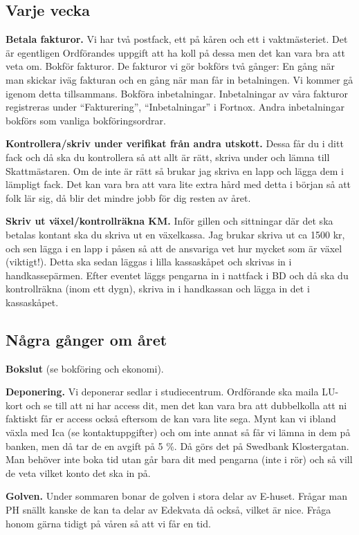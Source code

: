 \documentclass[10pt]{article}
\begin{document}
\subsection{Varje vecka}
\textbf{Betala fakturor.} Vi har två postfack, ett på kåren och ett i vaktmästeriet. Det är egentligen Ordförandes uppgift att ha koll på dessa men det kan vara bra att veta om.
Bokför fakturor. De fakturor vi gör bokförs två gånger: En gång när man skickar iväg fakturan och en gång när man får in betalningen. Vi kommer gå igenom detta tillsammans.
Bokföra inbetalningar. Inbetalningar av våra fakturor registreras under “Fakturering”, “Inbetalningar” i Fortnox. Andra inbetalningar bokförs som vanliga bokföringsordrar.

\textbf{Kontrollera/skriv under verifikat från andra utskott.} Dessa får du i ditt fack och då ska du kontrollera så att allt är rätt, skriva under och lämna till Skattmästaren. Om de inte är rätt så brukar jag skriva en lapp och lägga dem i lämpligt fack. Det kan vara bra att vara lite extra hård med detta i början så att folk lär sig, då blir det mindre jobb för dig resten av året.

\textbf{Skriv ut växel/kontrollräkna KM.} Inför gillen och sittningar där det ska betalas kontant ska du skriva ut en växelkassa. Jag brukar skriva ut ca 1500 kr, och sen lägga i en lapp i påsen så att de ansvariga vet hur mycket som är växel (viktigt!). Detta ska sedan läggas i lilla kassaskåpet och skrivas in i handkassepärmen. Efter eventet läggs pengarna in i nattfack i BD och då ska du kontrollräkna (inom ett dygn), skriva in i handkassan och lägga in det i kassaskåpet.

\subsection{Några gånger om året}
\textbf{Bokslut} (se bokföring och ekonomi).

\textbf{Deponering.} Vi deponerar sedlar i studiecentrum. Ordförande ska maila LU-kort och se till att ni har access dit, men det kan vara bra att dubbelkolla att ni faktiskt får er access också eftersom de kan vara lite sega. Mynt kan vi ibland växla med Ica (se kontaktuppgifter) och om inte annat så får vi lämna in dem på banken, men då tar de en avgift på 5 \%. Då görs det på Swedbank Klostergatan. Man behöver inte boka tid utan går bara dit med pengarna (inte i rör) och så vill de veta vilket konto det ska in på.

\textbf{Golven. }Under sommaren bonar de golven i stora delar av E-huset. Frågar man PH snällt kanske de kan ta delar av Edekvata då också, vilket är nice. Fråga honom gärna tidigt på våren så att vi får en tid.
\end{document}
